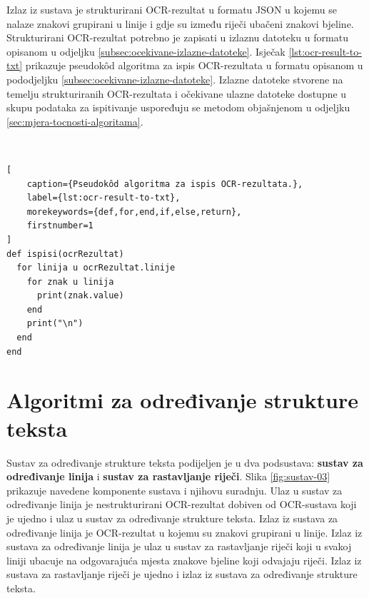 \documentclass[times, utf8, zavrsni]{fer}
\begin{document}
\pagebreak

Izlaz iz sustava je strukturirani OCR-rezultat u
formatu JSON u kojemu se nalaze znakovi grupirani u linije i gdje su između
riječi ubačeni znakovi bjeline. Strukturirani OCR-rezultat potrebno je zapisati
u izlaznu datoteku u formatu opisanom u odjeljku
\ref{subsec:ocekivane-izlazne-datoteke}. Isječak \ref{lst:ocr-result-to-txt}
prikazuje pseudokôd algoritma za ispis OCR-rezultata u formatu opisanom u
pododjeljku \ref{subsec:ocekivane-izlazne-datoteke}. Izlazne datoteke stvorene
na temelju strukturiranih OCR-rezultata i očekivane ulazne datoteke dostupne u
skupu podataka za ispitivanje uspoređuju se metodom objašnjenom u odjeljku
\ref{sec:mjera-tocnosti-algoritama}.

\

\begin{lstlisting}[
    caption={Pseudokôd algoritma za ispis OCR-rezultata.},
    label={lst:ocr-result-to-txt},
    morekeywords={def,for,end,if,else,return},
    firstnumber=1
]
def ispisi(ocrRezultat)
  for linija u ocrRezultat.linije
    for znak u linija
      print(znak.value)
    end
    print("\n")
  end
end
\end{lstlisting}

















\chapter{Algoritmi za određivanje strukture teksta}
\label{chap:algoritmi-za-odredivanje-strukture-teksta}
Sustav za određivanje strukture teksta podijeljen je u dva podsustava:
\textbf{sustav za određivanje linija} i \textbf{sustav za rastavljanje riječi}.
Slika \ref{fig:sustav-03} prikazuje navedene komponente sustava i njihovu
suradnju. Ulaz u sustav za određivanje linija je nestrukturirani OCR-rezultat
dobiven od OCR-sustava koji je ujedno i ulaz u sustav za određivanje strukture
teksta. Izlaz iz sustava za određivanje linija je OCR-rezultat
u kojemu su znakovi grupirani u linije. Izlaz iz sustava za određivanje linija
je ulaz u sustav za rastavljanje riječi koji u svakoj liniji ubacuje na
odgovarajuća mjesta znakove bjeline koji odvajaju riječi. Izlaz iz sustava za
rastavljanje riječi je ujedno i izlaz iz sustava za određivanje strukture
teksta.
\end{document}
